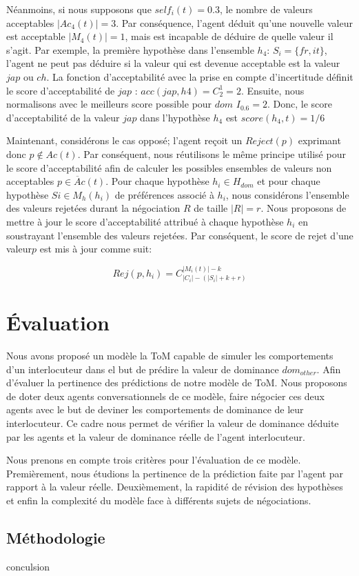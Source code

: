 			Néanmoins, si nous supposons que  $self_i(t)=0.3$, le nombre de valeurs acceptables $|Ac_4(t)| = 3$.  Par conséquence, l'agent déduit qu'une nouvelle valeur est acceptable $|M_4(t)|=1$, mais est incapable de déduire de quelle valeur il s'agit. Par exemple, la première hypothèse dans l'ensemble $h_4$: $S_i = \{fr, it\}$, l'agent ne peut pas déduire si la valeur qui est devenue acceptable est la valeur $jap$ ou $ch$. La fonction d'acceptabilité avec la prise en compte d'incertitude définit le score d'acceptabilité de $jap$ : 
			$ acc(jap, h4) = C^1_2 = 2$. Ensuite, nous normalisons avec le meilleurs score possible pour $dom$ $I_{0.6}=2$. Donc, le score d'acceptabilité de la valeur $jap$ dans l'hypothèse $h_4$ est $score(h_4,t)= 1/6$
			
	
	Maintenant, considérons le cas opposé; l'agent reçoit un $Reject(p)$ exprimant donc $p \not \in Ac(t)$. Par conséquent, nous réutilisons le même principe utilisé pour le score d'acceptabilité afin de calculer les possibles ensembles de valeurs non acceptables $ p \in \overline Ac(t)$. Pour chaque hypothèse $h_i \in H_{dom}$ et pour chaque hypothèse $Si \in M_h(h_i)$ de préférences associé à $h_i$, nous considérons l'ensemble des valeurs rejetées durant la négociation $R$ de taille $ |R| = r$. Nous proposons de mettre à jour le score d'acceptabilité attribué à chaque hypothèse $h_i$ en soustrayant l'ensemble des valeurs rejetées.
	Par conséquent, le score de rejet d'une valeur$p$ est mis à jour comme suit:
	
		\begin{equation}
			Rej(p, h_i) = C_{|C_i|-(|S_i| + k + r)}^{|M_i(t)| - k}
		\end{equation}
	
	
	
\section{Évaluation}
	Nous avons proposé un modèle la ToM capable de simuler les comportements d'un interlocuteur dans el but de prédire la valeur de dominance $dom_{other}$. Afin d'évaluer la pertinence des prédictions de notre modèle de ToM. Nous proposons de doter deux agents conversationnels de ce modèle, faire négocier ces deux agents avec le but de deviner les comportements de dominance de leur interlocuteur. Ce cadre nous permet de vérifier la valeur de dominance déduite par les agents et la valeur de dominance réelle de l'agent interlocuteur. 
	
	Nous prenons en compte trois critères pour l'évaluation de ce modèle. Premièrement, nous étudions la pertinence de la prédiction faite par l'agent par rapport à la valeur réelle. Deuxièmement, la rapidité de révision des hypothèses  et enfin la complexité du modèle face à différents sujets de négociations.
	
	\subsection{Méthodologie}
		
conculsion